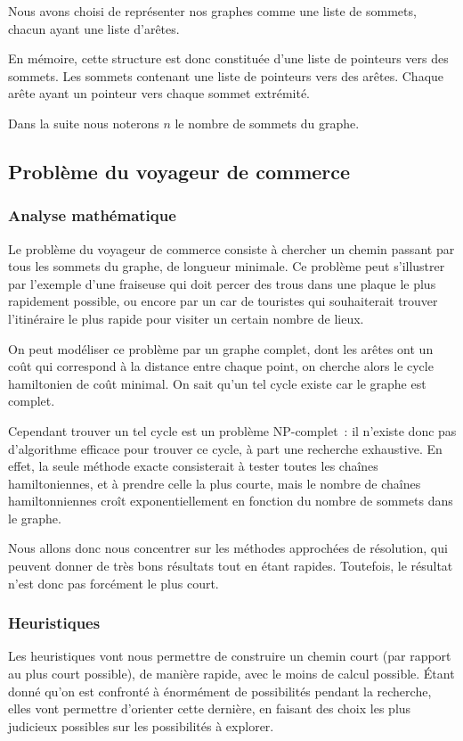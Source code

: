   Nous avons choisi de représenter nos graphes comme une liste de sommets,
  chacun ayant une liste d'arêtes.

  En mémoire, cette structure est donc constituée d'une liste de pointeurs
  vers des sommets. Les sommets contenant une liste de pointeurs vers des
  arêtes. Chaque arête ayant un pointeur vers chaque sommet extrémité.

  Dans la suite nous noterons $n$ le nombre de sommets du graphe.

\subsection{Problème du voyageur de commerce}\label{sec:tsp}
  \subsubsection{Analyse mathématique}
    Le problème du voyageur de commerce consiste à chercher un chemin passant
    par tous les sommets du graphe, de longueur minimale.
    Ce problème peut s'illustrer par l'exemple d'une
    fraiseuse qui doit percer des trous dans une plaque le plus
    rapidement possible, ou encore par un car de touristes qui souhaiterait
    trouver l'itinéraire le plus rapide pour visiter un certain nombre de lieux.

    On peut modéliser ce problème par un graphe complet, dont les arêtes ont un
    coût qui correspond à la distance entre chaque point, on cherche alors le
    cycle hamiltonien de coût minimal. On sait qu'un tel cycle existe car le
    graphe est complet.

    Cependant trouver un tel cycle est un problème NP-complet~: il n'existe
    donc pas d'algorithme efficace pour trouver ce cycle, à part une recherche
    exhaustive.
    En effet, la seule méthode exacte consisterait à tester toutes les chaînes
    hamiltoniennes, et à prendre celle la plus courte, mais le nombre de chaînes
    hamiltonniennes croît exponentiellement en fonction du nombre de sommets
    dans le graphe.

    Nous allons donc nous concentrer sur les méthodes approchées de résolution,
    qui peuvent donner de très bons résultats tout en étant rapides.
    Toutefois, le résultat n'est donc pas forcément le plus court.

  \subsubsection{Heuristiques}
    Les heuristiques vont nous permettre de construire un chemin court (par
    rapport au plus court possible), de manière rapide, avec le moins de calcul
    possible.  Étant donné qu'on est confronté à énormément de possibilités
    pendant la recherche, elles vont permettre d'orienter cette dernière, en
    faisant des choix les plus judicieux possibles sur les possibilités à
    explorer.

